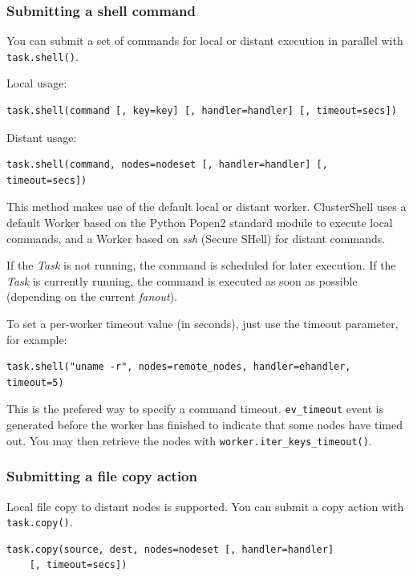 \documentclass[english,a4paper]{csuserguide}
\newcommand{\Task}{\textit{Task}\xspace}
\begin{document}
\subsubsection{Submitting a shell command}
\label{taskshell}
You can submit a set of commands for local or distant execution in parallel with \lstinline+task.shell()+.

Local usage:
\begin{lstlisting}[breaklines=true, breakatwhitespace=true]
task.shell(command [, key=key] [, handler=handler] [, timeout=secs])
\end{lstlisting}
Distant usage:
\begin{lstlisting}[breaklines=true, breakatwhitespace=true]
task.shell(command, nodes=nodeset [, handler=handler] [, timeout=secs])
\end{lstlisting}

This method makes use of the default local or distant worker. ClusterShell uses a default Worker based on the Python Popen2 standard module to execute local commands, and a Worker based on \textit{ssh} (Secure SHell) for distant commands.

If the \Task is not running, the command is scheduled for later execution. If the \Task is currently running, the command is executed as soon as possible (depending on the current \emph{fanout}).

To set a per-worker timeout value (in seconds), just use the timeout parameter, for example:
\medskip
\begin{lstlisting}[breaklines=true, breakatwhitespace=true]
task.shell("uname -r", nodes=remote_nodes, handler=ehandler, timeout=5)
\end{lstlisting}

This is the prefered way to specify a command timeout. \lstinline+ev_timeout+ event is generated before the worker has finished to indicate that some nodes have timed out. You may then retrieve the nodes with \lstinline+worker.iter_keys_timeout()+.

\subsubsection{Submitting a file copy action}

Local file copy to distant nodes is supported. You can submit a copy action with \lstinline+task.copy()+.
\begin{lstlisting}[breaklines=true, breakatwhitespace=true]
task.copy(source, dest, nodes=nodeset [, handler=handler] 
	[, timeout=secs])
\end{lstlisting}
\end{document}
